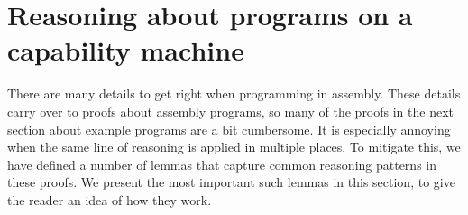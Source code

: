 \documentclass[format=acmsmall, review=true, screen=true]{acmart}
\newenvironment{toplas}%
    {\color{OliveGreen}}{}
\newcommand{\itoplassug}[1]{}
\begin{document}
\begin{toplas}
\section{Reasoning about programs on a capability machine}
\label{sec:reasoning}
There are many details to get right when programming in assembly. These details
carry over to proofs about assembly programs, so many of the proofs in the next
section about example programs are a bit cumbersome. It is especially annoying
when the same line of reasoning is applied in multiple places. To mitigate this,
we have defined a number of lemmas that capture common reasoning patterns in
these proofs. We present the most important such lemmas in this section, to give
the reader an idea of how they work.


\end{toplas}
\end{document}
